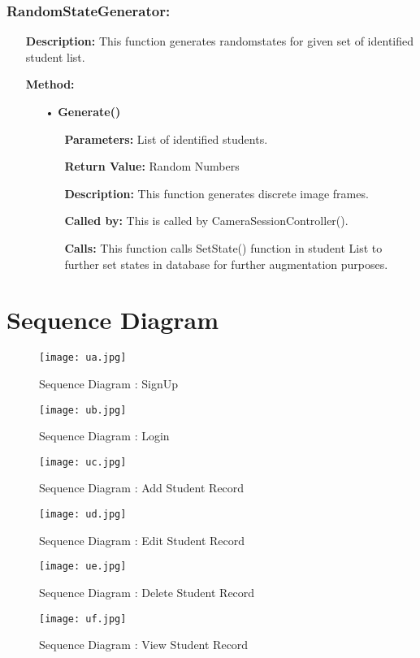 \documentclass{scrreprt}
\begin{document}
\subsection{RandomStateGenerator:}
\begin{enumerate}
\item[] \textbf{Description:} This function generates randomstates for given set of identified student list.
\item[] \textbf{Method:}
\begin{itemize}
\item [•] \textbf{Generate()}
\begin{itemize}
\item [] \textbf{Parameters:} List of identified students.
\item [] \textbf{Return Value:} Random Numbers
\item [] \textbf{Description:} This function generates discrete image frames.
\item [] \textbf{Called by:} This is called by CameraSessionController().
\item [] \textbf{Calls:} This function calls SetState() function in student List to further set states in database for further augmentation purposes.
\end{itemize}
\end{itemize}
\end{enumerate}
\chapter{Sequence Diagram}
\begin{figure}[h!]
\centering
\texttt{[image: ua.jpg]}
\caption{Sequence Diagram : SignUp}
\end{figure}
\newpage
\begin{figure}[h!]
\centering
\texttt{[image: ub.jpg]}
\caption{Sequence Diagram : Login}
\end{figure}
\newpage
\begin{figure}[h!]
\centering
\texttt{[image: uc.jpg]}
\caption{Sequence Diagram : Add Student Record}
\end{figure}
\begin{figure}[h!]
\centering
\texttt{[image: ud.jpg]}
\caption{Sequence Diagram : Edit Student Record}
\end{figure}
\newpage
\begin{figure}
\centering
\texttt{[image: ue.jpg]}
\caption{Sequence Diagram : Delete Student Record}
\end{figure}
\begin{figure}
\centering
\texttt{[image: uf.jpg]}
\caption{Sequence Diagram : View Student Record}
\end{figure}
\end{document}
